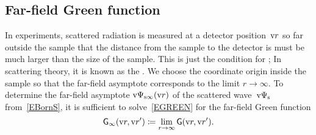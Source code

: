 \subsection{Far-field Green function}\label{SDWGreen}

In experiments, scattered radiation is measured
at a detector position~$\text{v}{r}$ so far outside the sample
that the distance from the sample to the detector
is must be much larger than the size of the sample.
This is just the condition for ;
%
In scattering theory,
it is known as the .
%
We choose the coordinate origin
%
%
inside the sample so that the far-field asymptote corresponds to the limit $r\to\infty$.
To determine the far-field asymptote $\text{v}\Psi_{\text{s}\infty}(\text{v}{r})$
of the scattered wave~$\text{v}\Psi_\text{s}$ from~\cref{EBornS},
it is sufficient to solve~\cref{EGREEN} for the far-field Green function
\begin{equation}\label{EGinftydef}
  \mathsf{G}_\infty(\text{v}{r},\text{v}{r}')\coloneqq \lim_{r\to\infty} \mathsf{G}(\text{v}{r},\text{v}{r}').
\end{equation}


